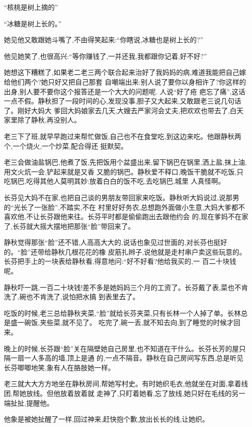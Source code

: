 ﻿\documentclass[12pt]{article}
\begin{document}
``核桃是树上摘的\myrule ''

``冰糖是树上长的。''

她见他又敢跟她斗嘴了,不由得笑起来:``你瞎说,冰糖也是树上长的?''

他见她笑了,也很高兴:``等你赚钱了,一并还我\myrule ,我都跟你记着,好不好?''

她想这下糟糕了,如果老二老三两个联合起来治好了我妈妈的病,难道我能把自己嫁给他们两个?她只好又把自己那套
自嘲端出来:别人说了要你以身相许了?你这样的出身,别人要不要你这个报答还是一个大大的问题呢. 人说``好了疮
疤忘了痛'',这话一点不假。静秋担了一段时间的心,发现没事,胆子又大起来,又敢跟老三说几句话了。刚好大妈大
爹回大妈娘家去几天,大嫂去严家河会丈夫,把欢欢也带去了,白天家里除了静秋,再没别人。

老三下了班,就早早跑过来帮忙做饭,自己也不在食堂吃,到这边来吃。他跟静秋两个,一个烧火,一个炒菜,配合得还
挺默契。

老三会做油盐锅巴,他煮了饭,先把饭用个盆盛出来,留下锅巴在锅里,洒上盐,抹上油,用文火炕一会,铲起来就是又香
又脆的锅巴。静秋爱不释口,晚饭干脆就不吃饭,只吃锅巴,吃得其他人莫明其妙:放着白白的饭不吃,去吃锅巴,城里
人真怪啊。

长芬见大妈不在家,也把自己谈的男朋友带回家来吃饭。静秋听大妈说过,说那男的``光长了一张脸'',不踏实,不在
村里好好务农,总想跑外面做小生意,大妈大爹都不喜欢他,不让长芬跟他来往。长芬平时都是偷偷跑出去跟他约会
的,现在爹妈不在家了,长芬就大摇大摆地把那张``脸''带回来了。

静秋觉得那张``脸''还不错,人高高大大的,说话也象见过世面的,对长芬也挺好的。``脸''还带给静秋几根花花的橡
皮筋扎辫子,说他就是走村串户卖这些玩意的。长芬把手上的一块表给静秋看,得意地问:``好不好看?他给我买的,一
百二十块钱呢。

静秋吓一跳,一百二十块钱!差不多是她妈妈三个月的工资了。长芬戴了表,菜也不肯洗了,碗也不肯洗了,说怕把水搞
到表里去了。

吃饭的时候,老三总给静秋夹菜,``脸''就给长芬夹菜,只有长林一个人掉了单。长林总是盛一碗饭,夹些菜,就不见了。
吃完了,碗一丢,就不知去向,到了睡觉的时候才回来。

晚上的时候,长芬跟``脸''关在隔壁她自己房里,也不知道在干什么。长芬长芳的屋只隔一扇一人多高的墙,顶上是通
的,一点不隔音。静秋在自己房间写东西,总是听见长芬唧唧地笑,象有人在胳肢她一样。

老三就大大方方地坐在静秋房间,帮她写村史。有时她织毛衣,他就坐在对面,拿着线团,帮她放线。但他放着放着就
走神了,只盯着她看,忘了放线,她只好在毛线的另一端扯扯,提醒他。

他象是被她扯醒了一样,回过神来,赶快抱个歉,放出长长的线,让她织。
\end{document}
